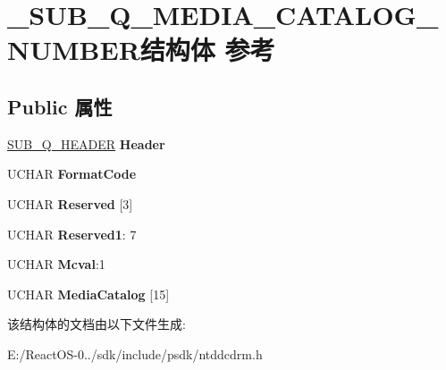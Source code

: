 \hypertarget{struct___s_u_b___q___m_e_d_i_a___c_a_t_a_l_o_g___n_u_m_b_e_r}{}\section{\+\_\+\+S\+U\+B\+\_\+\+Q\+\_\+\+M\+E\+D\+I\+A\+\_\+\+C\+A\+T\+A\+L\+O\+G\+\_\+\+N\+U\+M\+B\+E\+R结构体 参考}
\label{struct___s_u_b___q___m_e_d_i_a___c_a_t_a_l_o_g___n_u_m_b_e_r}
\subsection*{Public 属性}
\begin{DoxyCompactItemize}
\item 
\mbox{\label{struct___s_u_b___q___m_e_d_i_a___c_a_t_a_l_o_g___n_u_m_b_e_r_ade94b4c14fcacdf83a181e35fb4c035b}} 
\hyperlink{struct___s_u_b___q___h_e_a_d_e_r}{S\+U\+B\+\_\+\+Q\+\_\+\+H\+E\+A\+D\+ER} {\bfseries Header}
\item 
\mbox{\label{struct___s_u_b___q___m_e_d_i_a___c_a_t_a_l_o_g___n_u_m_b_e_r_ab94345413563a1492e2af58b22c7486b}} 
U\+C\+H\+AR {\bfseries Format\+Code}
\item 
\mbox{\label{struct___s_u_b___q___m_e_d_i_a___c_a_t_a_l_o_g___n_u_m_b_e_r_a84b02fb4ba05176270a1198ec0696e92}} 
U\+C\+H\+AR {\bfseries Reserved} \mbox{[}3\mbox{]}
\item 
\mbox{\label{struct___s_u_b___q___m_e_d_i_a___c_a_t_a_l_o_g___n_u_m_b_e_r_a987f837e6fabf275a40eb2228909f02a}} 
U\+C\+H\+AR {\bfseries Reserved1}\+: 7
\item 
\mbox{\label{struct___s_u_b___q___m_e_d_i_a___c_a_t_a_l_o_g___n_u_m_b_e_r_a11582b9cba0e2bc9097d8b28e2d43906}} 
U\+C\+H\+AR {\bfseries Mcval}\+:1
\item 
\mbox{\label{struct___s_u_b___q___m_e_d_i_a___c_a_t_a_l_o_g___n_u_m_b_e_r_a7aa1c36459c83573d96860f75518e2f6}} 
U\+C\+H\+AR {\bfseries Media\+Catalog} \mbox{[}15\mbox{]}
\end{DoxyCompactItemize}


该结构体的文档由以下文件生成\+:\begin{DoxyCompactItemize}
\item 
E\+:/\+React\+O\+S-\/0../sdk/include/psdk/ntddcdrm.\+h\end{DoxyCompactItemize}
